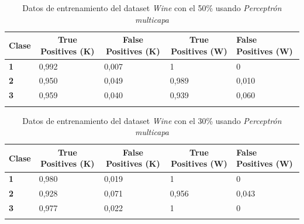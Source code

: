 \documentclass[10pt,a4paper]{article}
\begin{document}
\begin{table}[h!]
	\begin{tabular}{lllll}
		\hline
		\multicolumn{1}{|c|}{\textbf{Clase}} & \multicolumn{1}{c|}{\textbf{True Positives (K)}} & \multicolumn{1}{c|}{\textbf{False Positives (K)}} & \multicolumn{1}{c|}{\textbf{True Positives (W)}} & \multicolumn{1}{l|}{\textbf{False Positives (W)}} \\ \hline
		\multicolumn{1}{|l|}{\textbf{1}} & \multicolumn{1}{l|}{0,992}          & \multicolumn{1}{l|}{0,007}          & \multicolumn{1}{l|}{1}          & \multicolumn{1}{l|}{0} \\ \hline
		\multicolumn{1}{|l|}{\textbf{2}} & \multicolumn{1}{l|}{0,950}          & \multicolumn{1}{l|}{0,049}          & \multicolumn{1}{l|}{0,989}          & \multicolumn{1}{l|}{0,010} \\ \hline
		\multicolumn{1}{|l|}{\textbf{3}} & \multicolumn{1}{l|}{0,959}          & \multicolumn{1}{l|}{0,040}          & \multicolumn{1}{l|}{0,939}          & \multicolumn{1}{l|}{0,060}\\ \hline
		\textbf{}                       &                                &                                &                                &                      
		
	\end{tabular}
	\caption{Datos de entrenamiento del dataset \emph{Wine} con el 50\% usando \emph{Perceptrón multicapa}}
	\label{tab:wine_percep_50}
\end{table}

\begin{table}[h!]
	\begin{tabular}{lllll}
		\hline
		\multicolumn{1}{|c|}{\textbf{Clase}} & \multicolumn{1}{c|}{\textbf{True Positives (K)}} & \multicolumn{1}{c|}{\textbf{False Positives (K)}} & \multicolumn{1}{c|}{\textbf{True Positives (W)}} & \multicolumn{1}{l|}{\textbf{False Positives (W)}} \\ \hline
		\multicolumn{1}{|l|}{\textbf{1}} & \multicolumn{1}{l|}{0,980}          & \multicolumn{1}{l|}{0,019}          & \multicolumn{1}{l|}{1}          & \multicolumn{1}{l|}{0} \\ \hline
		\multicolumn{1}{|l|}{\textbf{2}} & \multicolumn{1}{l|}{0,928}          & \multicolumn{1}{l|}{0,071}          & \multicolumn{1}{l|}{0,956}          & \multicolumn{1}{l|}{0,043} \\ \hline
		\multicolumn{1}{|l|}{\textbf{3}} & \multicolumn{1}{l|}{0,977}          & \multicolumn{1}{l|}{0,022}          & \multicolumn{1}{l|}{1}          & \multicolumn{1}{l|}{0}\\ \hline
		\textbf{}                       &                                &                                &                                &                      
		
	\end{tabular}
	\caption{Datos de entrenamiento del dataset \emph{Wine} con el 30\% usando \emph{Perceptrón multicapa}}
	\label{tab:wine_percep_20}
\end{table}
\end{document}
